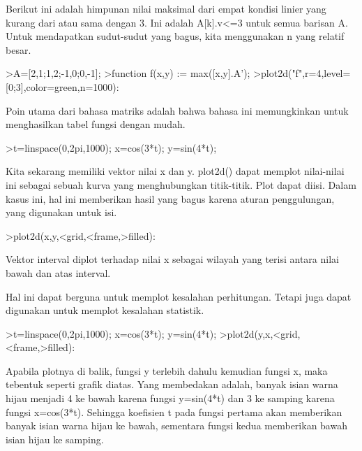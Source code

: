 \documentclass{article}
\begin{document}
\begin{eulernotebook}
\begin{eulercomment}
\begin{eulercomment}
\begin{eulercomment}
\begin{eulercomment}
\begin{eulercomment}
\begin{eulercomment}
\begin{eulercomment}
\begin{eulercomment}
\begin{eulercomment}
Berikut ini adalah himpunan nilai maksimal dari empat kondisi linier
yang kurang dari atau sama dengan 3. Ini adalah A[k].v\textless{}=3 untuk semua
barisan A. Untuk mendapatkan sudut-sudut yang bagus, kita menggunakan
n yang relatif besar.
\end{eulercomment}
\begin{eulerprompt}
>A=[2,1;1,2;-1,0;0,-1];
>function f(x,y) := max([x,y].A');
>plot2d("f",r=4,level=[0;3],color=green,n=1000):
\end{eulerprompt}
\begin{eulercomment}
Poin utama dari bahasa matriks adalah bahwa bahasa ini memungkinkan
untuk menghasilkan tabel fungsi dengan mudah.
\end{eulercomment}
\begin{eulerprompt}
>t=linspace(0,2pi,1000); x=cos(3*t); y=sin(4*t);
\end{eulerprompt}
\begin{eulercomment}
Kita sekarang memiliki vektor nilai x dan y. plot2d() dapat memplot
nilai-nilai ini sebagai sebuah kurva yang menghubungkan titik-titik.
Plot dapat diisi. Dalam kasus ini, hal ini memberikan hasil yang bagus
karena aturan penggulungan, yang digunakan untuk isi.
\end{eulercomment}
\begin{eulerprompt}
>plot2d(x,y,<grid,<frame,>filled):
\end{eulerprompt}
\begin{eulercomment}
Vektor interval diplot terhadap nilai x sebagai wilayah yang terisi
antara nilai bawah dan atas interval.

Hal ini dapat berguna untuk memplot kesalahan perhitungan. Tetapi juga
dapat digunakan untuk memplot kesalahan statistik.
\end{eulercomment}
\begin{eulerprompt}
>t=linspace(0,2pi,1000); x=cos(3*t); y=sin(4*t);
>plot2d(y,x,<grid,<frame,>filled):
\end{eulerprompt}
\begin{eulercomment}
Apabila plotnya di balik, fungsi y terlebih dahulu kemudian fungsi x,
maka tebentuk seperti grafik diatas. Yang membedakan adalah, banyak
isian warna hijau menjadi 4 ke bawah karena fungsi y=sin(4*t) dan 3 ke
samping karena fungsi x=cos(3*t). Sehingga koefisien t pada fungsi
pertama akan memberikan banyak isian warna hijau ke bawah, sementara
fungsi kedua memberikan bawah isian hijau ke samping.


\end{eulercomment}
\end{eulercomment}
\end{eulercomment}
\end{eulercomment}
\end{eulercomment}
\end{eulercomment}
\end{eulercomment}
\end{eulercomment}
\end{eulercomment}
\end{eulernotebook}
\end{document}
